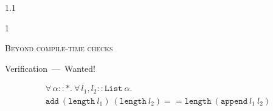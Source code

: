 \documentclass{slides}
\newcommand{\header}[1]{{\large\scshape \color{Red} #1} \medskip }
\newcommand{\blau}[1]{{\color{Blue} #1} \medskip }
\newenvironment{myslide}{\begin{slide}\color{Blue}\begin{boxedminipage}{1.1\hsize}\begin{boxedminipage}{1\hsize}\color{Black}
\vspace{-170\in}
}{%
\smallskip
\end{boxedminipage}
\end{boxedminipage}
\end{slide}}
\begin{document}



\begin{myslide}

\header{Beyond compile-time checks}

\blau{Verification~---~Wanted!}

{\small

\[\begin{array}{l}
\forall\,\alpha :: *.\ \forall\,l_1, l_2 :: \texttt{List}\ \alpha.\\ 
\texttt{add}\ (\texttt{length}\ l_1)\ (\texttt{length}\ l_2) == 
\texttt{length}\ (\texttt{append}\ l_1\ l_2)
\end{array}\]

}

\end{myslide}



\end{document}
